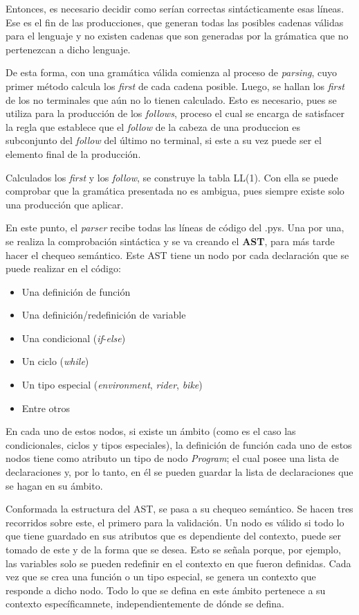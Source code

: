 \documentclass[12pt, letterpaper,spanish]{article}
\theoremstyle{definition}
\theoremstyle{remark}
\begin{document}
	Entonces, es necesario decidir como serían correctas sintácticamente esas líneas. Ese es el fin de las producciones, que generan todas las posibles cadenas válidas para el lenguaje y no existen cadenas que son generadas por la grámatica que no pertenezcan a dicho lenguaje.

	De esta forma, con una gramática válida comienza al proceso de \emph{parsing}, cuyo primer método calcula los \emph{first} de cada cadena posible. Luego, se hallan los \emph{first} de los no terminales que aún no lo tienen calculado. Esto es necesario, pues se utiliza para la producción de los \emph{follows}, proceso el cual se encarga de satisfacer la regla que establece que el \emph{follow} de la cabeza de una produccion es subconjunto del \emph{follow} del último no terminal, si este a su vez puede ser el elemento final de la producción.

        Calculados los \emph{first} y los \emph{follow}, se construye la tabla LL(1). Con ella se puede comprobar que la gramática presentada no es ambigua, pues siempre existe solo una producción que aplicar. 

	En este punto, el \emph{parser} recibe todas las líneas de código del .pys. Una por una, se realiza la comprobación sintáctica y se va creando el \textbf{AST}, para más tarde hacer el chequeo semántico. Este AST tiene un nodo por cada declaración que se puede realizar en el código:
	\begin{itemize}
		\item Una definición de función
		\item Una definición/redefinición de variable
		\item Una condicional (\emph{if}-\emph{else})
		\item Un ciclo (\emph{while})
		\item Un tipo especial (\emph{environment}, \emph{rider}, \emph{bike})
		\item Entre otros
	\end{itemize}

	En cada uno de estos nodos, si existe un ámbito (como es el caso las condicionales, ciclos y tipos especiales), la definición de función cada uno de estos nodos tiene como atributo un tipo de nodo \emph{Program}; el cual posee una lista de declaraciones y, por lo tanto, en él se pueden guardar la lista de declaraciones que se hagan en su ámbito.

        Conformada la estructura del AST, se pasa a su chequeo semántico. Se hacen tres recorridos sobre este, el primero para la validación. Un nodo es válido si todo lo que tiene guardado en sus atributos que es dependiente del contexto, puede ser tomado de este y de la forma que se desea. Esto se señala porque, por ejemplo, las variables solo se pueden redefinir en el contexto en que fueron definidas. Cada vez que se crea una función o un tipo especial, se genera un contexto que responde a dicho nodo. Todo lo que se defina en este ámbito pertenece a su contexto específicamnete, independientemente de dónde se defina. 
\end{document}
